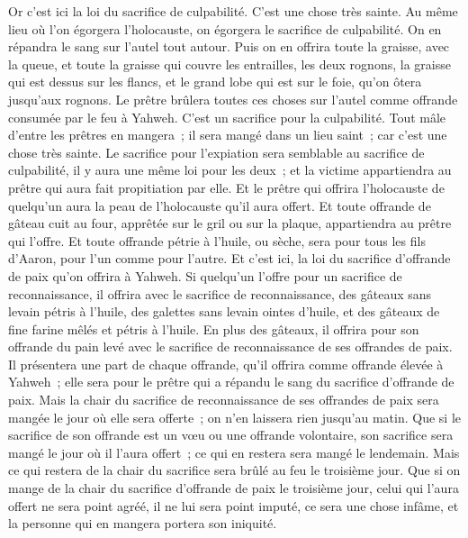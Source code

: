 \begin{multicols}{2}
\VerseOne{}Or c'est ici la loi du sacrifice de culpabilité. C'est une chose très sainte.
Au même lieu où l'on égorgera l'holocauste, on égorgera le sacrifice de culpabilité. On en répandra le sang sur l'autel tout autour.
Puis on en offrira toute la graisse, avec la queue, et toute la graisse qui couvre les entrailles,
les deux rognons, la graisse qui est dessus sur les flancs, et le grand lobe qui est sur le foie, qu'on ôtera jusqu'aux rognons.
Le prêtre brûlera toutes ces choses sur l'autel comme offrande consumée par le feu à Yahweh. C'est un sacrifice pour la culpabilité.
Tout mâle d'entre les prêtres en mangera~; il sera mangé dans un lieu saint~; car c'est une chose très sainte.
Le sacrifice pour l'expiation sera semblable au sacrifice de culpabilité, il y aura une même loi pour les deux~; et la victime appartiendra au prêtre qui aura fait propitiation par elle.
Et le prêtre qui offrira l'holocauste de quelqu'un aura la peau de l'holocauste qu'il aura offert.
Et toute offrande de gâteau cuit au four, apprêtée sur le gril ou sur la plaque, appartiendra au prêtre qui l'offre.
Et toute offrande pétrie à l'huile, ou sèche, sera pour tous les fils d'Aaron, pour l'un comme pour l'autre.
Et c'est ici, la loi du sacrifice d'offrande de paix qu'on offrira à Yahweh.
Si quelqu'un l'offre pour un sacrifice de reconnaissance, il offrira avec le sacrifice de reconnaissance, des gâteaux sans levain pétris à l'huile, des galettes sans levain ointes d'huile, et des gâteaux de fine farine mêlés et pétris à l'huile.
En plus des gâteaux, il offrira pour son offrande du pain levé avec le sacrifice de reconnaissance de ses offrandes de paix.
Il présentera une part de chaque offrande, qu'il offrira comme offrande élevée à Yahweh~; elle sera pour le prêtre qui a répandu le sang du sacrifice d'offrande de paix.
Mais la chair du sacrifice de reconnaissance de ses offrandes de paix sera mangée le jour où elle sera offerte~; on n'en laissera rien jusqu'au matin.
Que si le sacrifice de son offrande est un vœu ou une offrande volontaire, son sacrifice sera mangé le jour où il l'aura offert~; ce qui en restera sera mangé le lendemain.
Mais ce qui restera de la chair du sacrifice sera brûlé au feu le troisième jour.
Que si on mange de la chair du sacrifice d'offrande de paix le troisième jour, celui qui l'aura offert ne sera point agréé, il ne lui sera point imputé, ce sera une chose infâme, et la personne qui en mangera portera son iniquité.

\end{multicols}
